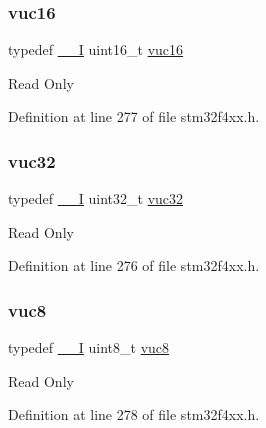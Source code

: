 \subsubsection{\texorpdfstring{vuc16}{vuc16}}
{\footnotesize\ttfamily typedef \hyperlink{group___c_m_s_i_s__core__definitions_gaf63697ed9952cc71e1225efe205f6cd3}{\+\_\+\+\_\+I} uint16\+\_\+t \hyperlink{group___exported__types_ga7f6037565f0caa27727c8b871daf0d56}{vuc16}}

Read Only 

Definition at line 277 of file stm32f4xx.\+h.

\mbox{\label{group___exported__types_ga2e08e321a35a55e72c5b3a507e76371f}} 
\subsubsection{\texorpdfstring{vuc32}{vuc32}}
{\footnotesize\ttfamily typedef \hyperlink{group___c_m_s_i_s__core__definitions_gaf63697ed9952cc71e1225efe205f6cd3}{\+\_\+\+\_\+I} uint32\+\_\+t \hyperlink{group___exported__types_ga2e08e321a35a55e72c5b3a507e76371f}{vuc32}}

Read Only 

Definition at line 276 of file stm32f4xx.\+h.

\mbox{\label{group___exported__types_gab0ec90ac9b2c5864755998c8d37c264a}} 
\subsubsection{\texorpdfstring{vuc8}{vuc8}}
{\footnotesize\ttfamily typedef \hyperlink{group___c_m_s_i_s__core__definitions_gaf63697ed9952cc71e1225efe205f6cd3}{\+\_\+\+\_\+I} uint8\+\_\+t \hyperlink{group___exported__types_gab0ec90ac9b2c5864755998c8d37c264a}{vuc8}}

Read Only 

Definition at line 278 of file stm32f4xx.\+h.

